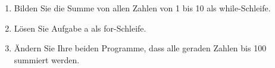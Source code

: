 \begin{enumerate}
  
\item Bilden Sie die Summe von allen Zahlen von 1 bis 10 als while-Schleife.

\item Lösen Sie Aufgabe a als for-Schleife.

\item Ändern Sie Ihre beiden Programme, dass alle geraden Zahlen bis 100 summiert werden.

\end{enumerate}